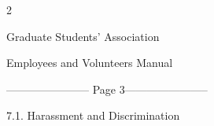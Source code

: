                                                                  



                                                                 



                                                                 



                                                                 



                                                                 



                                                                 



                                                                 



                                                                 



                                                                 



                                                                 



                                                                 



                                                                 



                                                                 



                                                                 



                                                              2  

  

                                      Graduate Students’ Association  

                                   Employees and Volunteers Manual  


----------------------- Page 3-----------------------

                      7.1.     Harassment and Discrimination  



